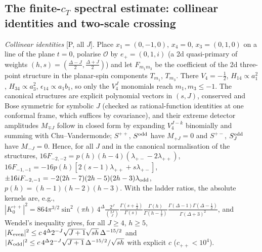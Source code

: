 \documentclass[aps,prl,onecolumn,superscriptaddress,nofootinbib]{revtex4-2}
\begin{document}
\subsection{The finite-$c_T$ spectral estimate: collinear identities and two-scale crossing}
\label{sec:angcross}
\emph{Collinear identities} [P, all $J$]. Place $x_1=(0,-1,0)$, $x_4=0$, $x_3=(0,1,0)$ on a line of the plane $t=0$,
polarise $\mathcal O$ by $e_+=(0,1,i)$ (a 2d quasi-primary of weights $(h,s)=(\frac{\Delta-J}2,\frac{\Delta+J}2)$) and let
$F_{m_1m_3}$ be the coefficient of the 2d three-point structure in the planar-spin components $T_{m_1}$, $T_{m_3}$.
There $V_4=-\frac12$, $H_{14}\propto a_1^2$, $H_{34}\propto a_3^2$, $\epsilon_{14}\propto a_1b_1$, so only the $V_4^J$
monomials reach $m_1,m_3\le-1$. The canonical structures are explicit polynomial vectors in $(s,J)$, conserved and Bose
symmetric for symbolic $J$ (checked as rational-function identities at one conformal frame, which suffices by
covariance), and their extreme detector amplitudes $M_{\mp J}$ follow in closed form by expanding $V_4^{J-k}$
binomially and summing with Chu--Vandermonde; $S^{++}$, $S^{\rm odd}$ have $M_{+J}=0$ and $S^{+-}$, $S^{\rm odd}_J$ have
$M_{-J}=0$. Hence, for all $J$ and in the canonical normalisation of the structures,
$16F_{-2,-2}=p(h)(h-4)(\lambda_{+-}-2\lambda_{++})$, $16F_{-1,-1}=-16p(h)[2(s-1)\lambda_{++}+s\lambda_{+-}]$,
$\pm16iF_{-2,-1}=-2(2h-7)(2h-5)(2h-3)\lambda_{\rm odd}$, $p(h)=(h-1)(h-2)(h-3)$. With the ladder ratios, the absolute
kernels are, e.g., $|K^{++}_0|^2=864\pi^{3/2}\sin^2(\pi h)\,4^\Delta\frac{2^J}{\binom{2J}J}\frac{\Gamma(s+\frac12)}{\Gamma(s)}
\frac{\Gamma(h)}{\Gamma(h-\frac12)}\frac{\Gamma(\Delta-1)\Gamma(\Delta-\frac12)}{\Gamma(\Delta+3)^2}$, and Wendel's inequality gives,
for all $J\ge4$, $h\ge5$, $|K_{\rm even}|^2\le c\,4^\Delta2^{-J}\sqrt{J+1}\sqrt{sh}\,\Delta^{-15/2}$ and
$|K_{\rm odd}|^2\le c\,4^\Delta2^{-J}\sqrt{J+1}\,\Delta^{-15/2}/\sqrt{sh}$ with explicit $c$ ($c_{++}<10^4$).
\end{document}
